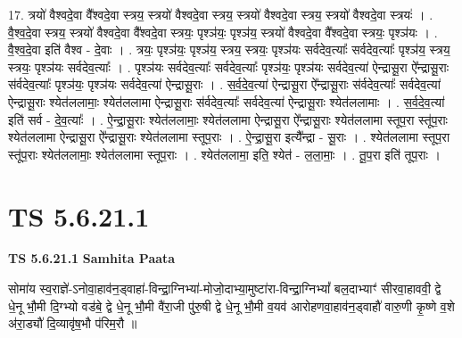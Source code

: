 \documentclass[17pt]{extarticle}
\begin{document}
17. त्रयो॑ वैश्वदे॒वा वै᳚श्वदे॒वा स्त्रय॒ स्त्रयो॑ वैश्वदे॒वा स्त्रय॒ स्त्रयो॑ वैश्वदे॒वा स्त्रय॒ स्त्रयो॑ वैश्वदे॒वा स्त्रयः॑ । . वै॒श्व॒दे॒वा स्त्रय॒ स्त्रयो॑ वैश्वदे॒वा वै᳚श्वदे॒वा स्त्रयः॒ पृश्ञ॑यः॒ पृश्ञ॑य॒ स्त्रयो॑ वैश्वदे॒वा वै᳚श्वदे॒वा स्त्रयः॒ पृश्ञ॑यः । . वै॒श्व॒दे॒वा इति॑ वैश्व - दे॒वाः । . त्रयः॒ पृश्ञ॑यः॒ पृश्ञ॑य॒ स्त्रय॒ स्त्रयः॒ पृश्ञ॑यः सर्वदेव॒त्याः᳚ सर्वदेव॒त्याः᳚ पृश्ञ॑य॒ स्त्रय॒ स्त्रयः॒ पृश्ञ॑यः सर्वदेव॒त्याः᳚ । . पृश्ञ॑यः सर्वदेव॒त्याः᳚ सर्वदेव॒त्याः᳚ पृश्ञ॑यः॒ पृश्ञ॑यः सर्वदेव॒त्या॑ ऐन्द्रासू॒रा ऐ᳚न्द्रासू॒राः स॑र्वदेव॒त्याः᳚ पृश्ञ॑यः॒ पृश्ञ॑यः सर्वदेव॒त्या॑ ऐन्द्रासू॒राः । . स॒र्व॒दे॒व॒त्या॑ ऐन्द्रासू॒रा ऐ᳚न्द्रासू॒राः स॑र्वदेव॒त्याः᳚ सर्वदेव॒त्या॑ ऐन्द्रासू॒राः श्येत॑ललामाः॒ श्येत॑ललामा ऐन्द्रासू॒राः स॑र्वदेव॒त्याः᳚ सर्वदेव॒त्या॑ ऐन्द्रासू॒राः श्येत॑ललामाः । . स॒र्व॒दे॒व॒त्या॑ इति॑ सर्व - दे॒व॒त्याः᳚ । . ऐ॒न्द्रा॒सू॒राः श्येत॑ललामाः॒ श्येत॑ललामा ऐन्द्रासू॒रा ऐ᳚न्द्रासू॒राः श्येत॑ललामा स्तूप॒रा स्तू॑प॒राः श्येत॑ललामा ऐन्द्रासू॒रा ऐ᳚न्द्रासू॒राः श्येत॑ललामा स्तूप॒राः । . ऐ॒न्द्रा॒सू॒रा इत्यै᳚न्द्रा - सू॒राः । . श्येत॑ललामा स्तूप॒रा स्तू॑प॒राः श्येत॑ललामाः॒ श्येत॑ललामा स्तूप॒राः । . श्येत॑ललामा॒ इति॒ श्येत॑ - ल॒ला॒माः॒ । . तू॒प॒रा इति॑ तूप॒राः । \newline
\pagebreak
{}

\section{ TS 5.6.21.1 }

\textbf{TS 5.6.21.1 } \newline
\textbf{Samhita Paata} \newline

सोमा॑य स्व॒राज्ञे॑-ऽनोवा॒हाव॑न॒ड्वाहा॑-विन्द्रा॒ग्निभ्या॑-मोजो॒दाभ्या॒मुष्टा॑रा-विन्द्रा॒ग्निभ्यां᳚ बल॒दाभ्याꣳ॑ सीरवा॒हाववी॒ द्वे धे॒नू भौ॒मी दि॒ग्भ्यो वड॑बे॒ द्वे धे॒नू भौ॒मी वै॑रा॒जी पु॑रु॒षी द्वे धे॒नू भौ॒मी व॒यव॑ आरोहणवा॒हाव॑न॒ड्वाहौ॑ वारु॒णी कृ॒ष्णे व॒शे अ॑रा॒ड्यौ॑ दि॒व्यावृ॑ष॒भौ प॑रिम॒रौ ॥ \newline
\end{document}
